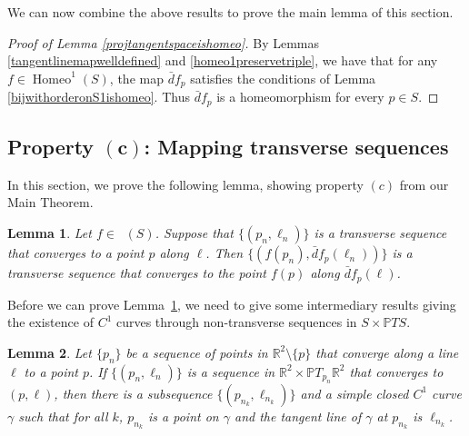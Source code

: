 \documentclass[sn-mathphys-num]{sn-jnl}%
\theoremstyle{thmstyleone}%
\newtheorem{lemma}{Lemma}[section]
\theoremstyle{thmstyletwo}%
\theoremstyle{thmstylethree}%
\DeclareMathOperator{\homeo}{Homeo}
\DeclareMathOperator{\thomeo}{Homeo^{1}}
\begin{document}
We can now combine the above results to prove the main lemma of this section.

\begin{proof}[Proof of Lemma \ref{projtangentspaceishomeo}]
By Lemmas \ref{tangentlinemapwelldefined} and \ref{homeo1preservetriple}, we have that for any $f \in \homeo^1(S)$, the map $\bar{d}f_p$ satisfies the conditions of Lemma \ref{bijwithorderonS1ishomeo}.  Thus $\bar{d}f_p$ is a homeomorphism for every $p \in S$. 
\end{proof}

\subsection{Property $\mathbf{(c)}$: Mapping transverse sequences}

In this section, we prove the following lemma, showing  property $(c)$ from our Main Theorem.

\begin{lemma}\label{preservetransverse}
Let $f \in \thomeo(S)$. Suppose that $\{(p_n, \ell_n)\}$ is a transverse sequence that converges to a point $p$ along $\ell$. Then $\{(f(p_n), \bar{d}f_p(\ell_n))\}$ is a transverse sequence that converges to the point $f(p)$ along $\bar{d}f_p(\ell)$.
\end{lemma}

Before we can prove Lemma~\ref{preservetransverse},  we need to give some intermediary results giving the existence of $C^1$ curves through non-transverse sequences in $S \times \mathbb{P}TS$.




\begin{lemma}\label{c1throughtangents}
Let $\{p_n\}$ be a sequence of points in $\mathbb{R}^2 \setminus \{p\}$ that converge along a line $\ell$ to a point $p$.  If $\{(p_n, \ell_n)\}$ is a sequence in $\mathbb{R}^2 \times \mathbb{P}T_{p_n}\mathbb{R}^2$ that converges to $(p,  \ell)$, then there is a subsequence $\{(p_{n_k}, \ell_{n_k})\}$ and a simple closed $C^1$ curve $\gamma$ such that for all $k$, $p_{n_k}$ is a point on $\gamma$ and the tangent line of $\gamma$ at $p_{n_k}$ is $\ell_{n_k}$.
\end{lemma}
\end{document}
